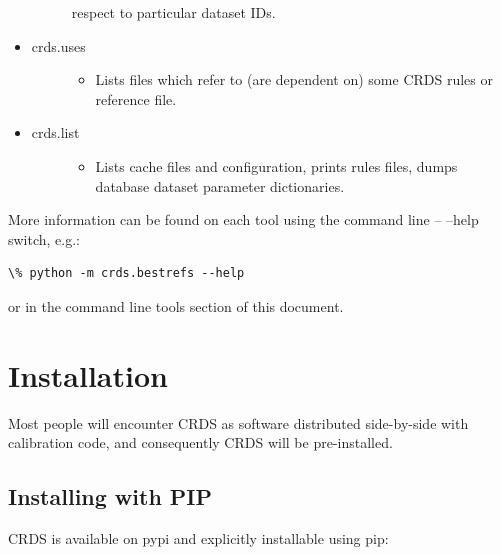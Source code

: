 \documentclass[letterpaper,10pt,english]{sphinxmanual}
\begin{document}
\begin{itemize}
\begin{description}
\begin{itemize}
\end{itemize}

respect to particular dataset IDs.

\end{description}

\item {} \begin{description}
\item[{crds.uses}] \leavevmode\begin{itemize}
\item {} 
Lists files which refer to (are dependent on) some CRDS rules or reference file.

\end{itemize}

\end{description}

\item {} \begin{description}
\item[{crds.list}] \leavevmode\begin{itemize}
\item {} 
Lists cache files and configuration,  prints rules files,  dumps database dataset parameter dictionaries.

\end{itemize}

\end{description}

\end{itemize}

More information can be found on each tool using the command line -- --help switch,  e.g.:

\begin{Verbatim}[commandchars=\\\{\}]
\% python -m crds.bestrefs --help
\end{Verbatim}

or in the command line tools section of this document.


\chapter{Installation}
\label{installation:installation}
Most people will encounter CRDS as software distributed side-by-side with calibration code,
and consequently CRDS will be pre-installed.


\section{Installing with PIP}
\label{installation:installing-with-pip}
CRDS is available on pypi and explicitly installable using pip:
\end{document}

